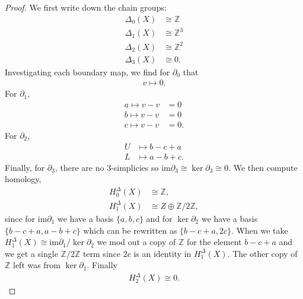 \documentclass[leqno]{article}
\theoremstyle{nonumberplain}
\newtheorem{proof}{Proof}
\newcommand{\im}{\mathrm{im}}
\newcommand{\Z}{\mathbb{Z}}
\begin{document}
\begin{proof}
We first write down the chain groups:
\begin{align*}
\Delta_0(X) &\cong \Z\\
\Delta_1(X) &\cong \Z^3\\
\Delta_2(X) &\cong \Z^2\\
\Delta_3(X) &\cong 0.
\end{align*}
Investigating each boundary map, we find for $\partial_0$ that
\begin{align*}
v \mapsto 0.
\end{align*}
For $\partial_1$,
\begin{align*}
a\mapsto v-v &= 0\\
b\mapsto v-v &= 0\\
c\mapsto v-v &= 0.
\end{align*}
For $\partial_2$,
\begin{align*}
U&\mapsto b-c+a\\
L&\mapsto a-b+c.
\end{align*}
Finally, for $\partial_3$, there are no 3-simplicies so $\im \partial_3 \cong \ker \partial_3 \cong 0$. We then compute homology,
\begin{align*}
H_0^\Delta(X) &\cong \Z,\\
H_1^\Delta(X) &\cong Z\oplus \Z/2\Z,
\end{align*}
since for $\im \partial_1$ we have a basis $\{a,b,c\}$ and for $\ker \partial_2$ we have a basis $\{b-c+a,a-b+c\}$ which can be rewritten as $\{b-c+a,2c\}$. When we take $H_1^\Delta(X) \cong \im \partial_1 / \ker \partial_2$ we mod out a copy of $\Z$ for the element $b-c+a$ and we get a single $\Z/2\Z$ term since $2c$ is an identity in $H_1^\Delta(X)$.  The other copy of $\Z$ left was from $\ker \partial_1$. Finally
\begin{align*}
H_2^\Delta(X) \cong 0.
\end{align*}
\end{proof}
\end{document}

